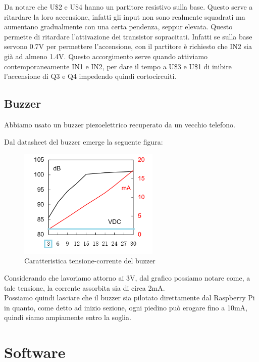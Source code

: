 \documentclass[12pt]{article}
\newcommand{\imgszland}{0.6\textwidth}
\newcommand{\raspi}{Raspberry Pi}
\begin{document}
Da notare che U\$2 e U\$4 hanno un partitore resistivo sulla base. Questo serve a ritardare la loro accensione, infatti gli input non sono realmente squadrati ma aumentano gradualmente con una certa pendenza, seppur elevata. Questo permette di ritardare l'attivazione dei transistor sopracitati. Infatti se sulla base servono 0.7V per permettere l'accensione, con il partitore è richiesto che IN2 sia già ad almeno 1.4V. Questo accorgimento serve quando attiviamo contemporaneamente IN1 e IN2, per dare il tempo a U\$3 e U\$1 di inibire l'accensione di Q3 e Q4 impedendo quindi cortocircuiti.

\subsection{Buzzer}

Abbiamo usato un buzzer piezoelettrico recuperato da un vecchio telefono.

Dal datasheet del buzzer emerge la seguente figura:
\begin{figure}[h]
\includegraphics[width=\imgszland]{buzzerDS}
\centering
\caption{Caratteristica tensione-corrente del buzzer}
\label{fig:buzzerDS}
\end{figure}

Considerando che lavoriamo attorno ai 3V, dal grafico possiamo notare come, a tale tensione, la corrente assorbita sia di circa 2mA.\\
Possiamo quindi lasciare che il buzzer sia pilotato direttamente dal \raspi{} in quanto, come detto ad inizio sezione, ogni piedino può erogare fino a 10mA, quindi siamo ampiamente entro la soglia.


\section{Software}
\end{document}
